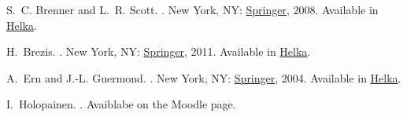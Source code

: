 \documentclass[12pt,oneside,final]{amsart}
\begin{document}
\begin{thebibliography}{1}

S.~C. {Brenner} and L.~R. {Scott}.
.
\newblock New York, NY: \href{https://doi.org/10.1007/978-0-387-75934-0}{Springer}, 2008.
Available in \href{https://helka.helsinki.fi/permalink/358UOH_INST/q5v72t/alma9934193675806253}{Helka}.

H.~{Brezis}.
.
\newblock New York, NY: \href{https://doi.org/10.1007/978-0-387-70914-7}{Springer}, 2011.
Available in \href{https://helka.helsinki.fi/permalink/358UOH_INST/1rnip4l/alma9926442113506253}{Helka}.

A.~{Ern} and J.-L. {Guermond}.
.
\newblock New York, NY: \href{https://doi.org/10.1007/978-1-4757-4355-5}{Springer}, 2004.
Available in \href{https://helka.helsinki.fi/permalink/358UOH_INST/1rnip4l/alma9934192676606253}{Helka}.

I.~{Holopainen}.
.
\newblock Avaiblabe on the Moodle page.

\end{thebibliography}
\end{document}
